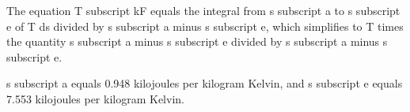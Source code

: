 The equation T subscript kF equals the integral from s subscript a to s subscript e of T ds divided by s subscript a minus s subscript e, which simplifies to T times the quantity s subscript a minus s subscript e divided by s subscript a minus s subscript e.

s subscript a equals 0.948 kilojoules per kilogram Kelvin, and s subscript e equals 7.553 kilojoules per kilogram Kelvin.